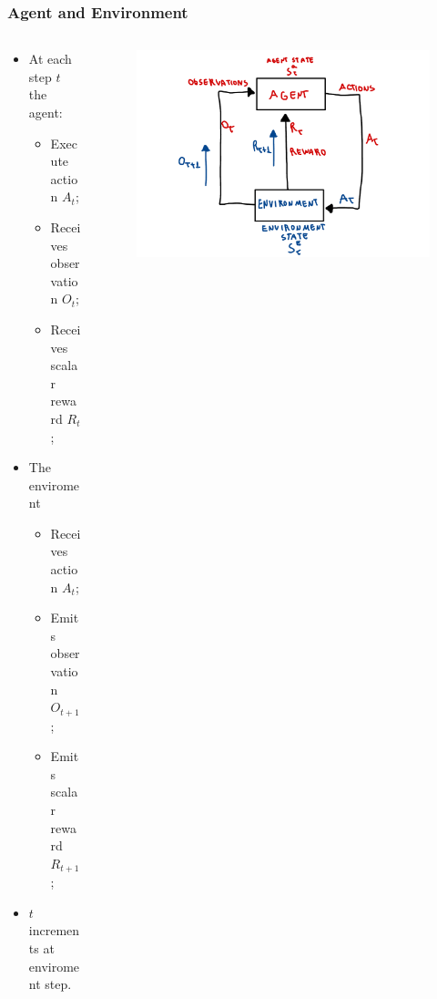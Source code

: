 \begin{frame}
    \frametitle{Agent and Environment}

    \begin{columns}
        \begin{column}{0.5\textwidth}

            \begin{itemize}
                \item At each step $t$ the agent:

                \begin{itemize}
                    \item Execute action $A_t$;
                    \item Receives observation $O_t$;
                    \item Receives scalar reward $R_t$;
                \end{itemize}
           

                \item The enviroment
                
                \begin{itemize}
                    \item Receives action $A_t$;
                    \item Emits observation $O_{t+1}$;
                    \item Emits scalar reward $R_{t+1}$;
                \end{itemize}

                \item $t$ increments at enviroment step.

            \end{itemize}

        \end{column}


        \begin{column}{0.5\textwidth}
            \begin{figure}
            \centering
                \includegraphics[width=1\textwidth]{sections/introduction/figures/reinforcement_learning_framework.pdf}
            \end{figure}
        \end{column}


\end{columns}
\end{frame}
